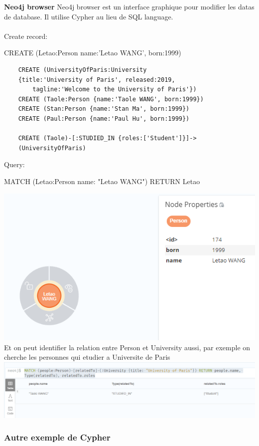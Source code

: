 \documentclass[12pt]{fphw}
\begin{document}
\newpage
\textbf{Neo4j browser}
Neo4j browser est un interface graphique pour modifier les datas de database. Il utilise Cypher au lieu de SQL language. \\
 \\
Create record:
\begin{center}
	CREATE (Letao:Person {name:'Letao WANG', born:1999})
\end{center}




\begin{lstlisting}
	CREATE (UniversityOfParis:University 
	{title:'University of Paris', released:2019, 
		tagline:'Welcome to the University of Paris'})
	CREATE (Taole:Person {name:'Taole WANG', born:1999})
	CREATE (Stan:Person {name:'Stan Ma', born:1999})
	CREATE (Paul:Person {name:'Paul Hu', born:1999})
	
	CREATE (Taole)-[:STUDIED_IN {roles:['Student']}]->
	(UniversityOfParis)
\end{lstlisting}

Query:
\begin{center}
	MATCH (Letao:Person {name: "Letao WANG"}) RETURN Letao\\ 
	
	
	
\end{center}

\begin{center}
	\includegraphics[width=0.5\columnwidth]{NeoWang.png} %
	\newline\newline
	Et on peut identifier la relation entre Person et University aussi, par exemple on cherche les personnes qui etudier a Universite de Paris\newline\newline
	\includegraphics[width=1\columnwidth]{NeoUParis.png} %
\end{center}

\newpage

\subsubsection*{Autre exemple de Cypher}
\end{document}
